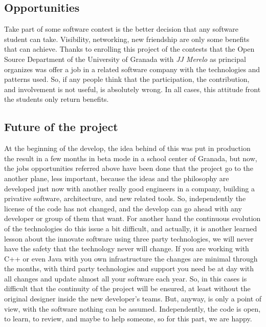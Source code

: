 \subsection{Opportunities}

Take part of some software contest is the better decision that any
software student can take. Visibility, networking, new friendship are only some
benefits that can achieve.
\intro
Thanks to enrolling this project of the contests that the Open Source Department of
the University of Granada with \textit{JJ Merelo} as principal organizes was offer a job
in a related software company with the technologies and patterns used.
So, if any people think that the participation, the contribution, and involvement
is not useful, is absolutely wrong. In all cases, this attitude front the
students only return benefits.

\subsection{Future of the project}

At the beginning of the develop, the idea behind of this was put in production
the result in a few months in beta mode in a school center of Granada, but now,
the jobs opportunities referred above have been done that the project go to the
another plane, less important, because the ideas and the philosophy are
developed just now with another really good engineers in a company, building a
privative software, architecture, and new related tools.
\intro
So, independently the license of the code has not changed, and the develop can
go ahead with any developer or group of them that want. For another hand the
continuous evolution of the technologies do this issue a
bit difficult, and actually, it is another learned lesson about the innovate
software using three party technologies, we will never have the safety that the
technology never will change. If you are working with C++ or even Java with you
own infrastructure the changes are minimal through the months, with third party
technologies and support you need be at day with all changes and update almost
all your software each year. So, in this cases is difficult that the continuity
of the project will be ensured, at least without the original designer inside the
new developer's teams. But, anyway, is only a point of view, with the software
nothing can be assumed.
\intro
Independently, the code is open, to learn, to review, and maybe to help someone,
so for this part, we are happy.

